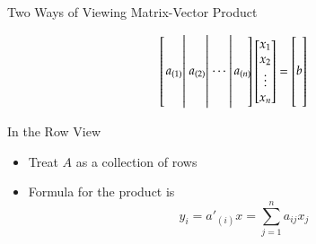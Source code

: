 \documentclass[10pt]{beamer}
\begin{document}
\begin{frame}{Two Ways of Viewing Matrix-Vector Product}
\begin{itemize}
\begin{equation*}
\begin{bmatrix}\left. \begin{matrix} \\ \\ a_{(1)}  \\ \\ \\ \end{matrix}\right|
       \left. \begin{matrix} \\ \\ a_{(2)}  \\ \\ \\ \end{matrix}\right|
       \left. \begin{matrix} \\ \\ {\cdots\ } \\ \\ \\ \end{matrix}\right|
              \begin{matrix} \\ \\ a_{(n)}  \\ \\ \\ \end{matrix}\negthickspace
\end{bmatrix}
\begin{bmatrix} x_1 \\ x_2 \\ \vdots \\ x_n \end{bmatrix}
=
\begin{bmatrix}  \\  \\ b \\  \\  \\ \end{bmatrix}
\end{equation*}

\end{itemize}   
\end{frame}
\begin{frame}{In the Row View}
\begin{itemize}
    \item Treat $A$ as a collection of rows
\begin{center}
\end{center}

\item Formula for the product is 
$$ y_i = a'_{(i)}x = \sum_{j=1}^n a_{ij}x_j$$
\end{itemize}

\end{frame}
\end{document}
